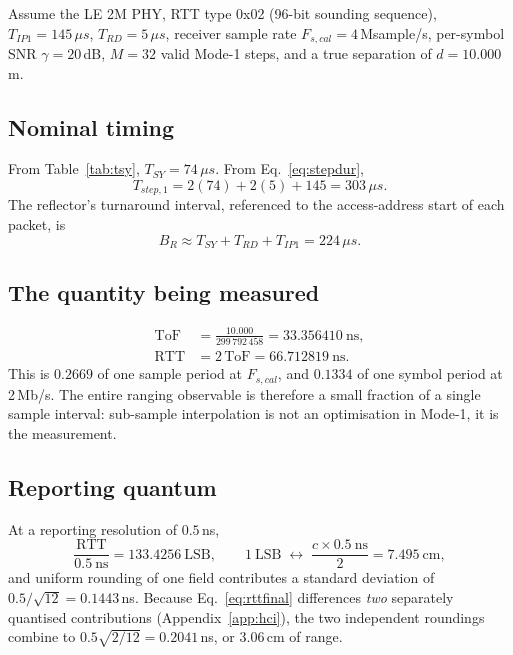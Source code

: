 \documentclass[11pt,a4paper]{article}
\newcommand{\us}{\,\ensuremath{\upmu}s}
\newcommand{\ToF}{\mathrm{ToF}}
\newcommand{\RTT}{\mathrm{RTT}}
\newcommand{\Tsy}{T_{SY}}
\newcommand{\Trd}{T_{RD}}
\newcommand{\Tip}{T_{IP1}}
\providecommand{\upmu}{\mu}
\begin{document}
Assume the LE 2M PHY, RTT type 0x02 (96-bit sounding sequence), $\Tip = 145\us$, $\Trd = 5\us$,
receiver sample rate $F_{s,cal} = 4$\,Msample/s, per-symbol SNR $\gamma = 20$\,dB, $M = 32$ valid
Mode-1 steps, and a true separation of $d = 10.000$\,m.

\subsection{Nominal timing}

From Table~\ref{tab:tsy}, $\Tsy = 74\us$. From Eq.~\eqref{eq:stepdur},
\begin{equation}
T_{step,1} = 2(74) + 2(5) + 145 = 303\us .
\end{equation}
The reflector's turnaround interval, referenced to the access-address start of each packet, is
\begin{equation}
B_R \approx \Tsy + \Trd + \Tip = 224\us .
\end{equation}

\subsection{The quantity being measured}

\begin{align}
\ToF &= \frac{10.000}{299\,792\,458} = 33.356410\ \text{ns}, \\
\RTT &= 2\,\ToF = 66.712819\ \text{ns} .
\end{align}
This is $0.2669$ of one sample period at $F_{s,cal}$, and $0.1334$ of one symbol period at 2\,Mb/s.
The entire ranging observable is therefore a small fraction of a single sample interval: sub-sample
interpolation is not an optimisation in Mode-1, it is the measurement.

\subsection{Reporting quantum}

At a reporting resolution of $0.5$\,ns,
\begin{equation}
\frac{\RTT}{0.5\ \text{ns}} = 133.4256\ \text{LSB},
\qquad
1\ \text{LSB} \;\leftrightarrow\; \frac{c \times 0.5\ \text{ns}}{2} = 7.495\ \text{cm},
\end{equation}
and uniform rounding of one field contributes a standard deviation of
$0.5/\sqrt{12} = 0.1443$\,ns. Because Eq.~\eqref{eq:rttfinal} differences \emph{two} separately
quantised contributions (Appendix~\ref{app:hci}), the two independent roundings combine to
$0.5\sqrt{2/12} = 0.2041$\,ns, or $3.06$\,cm of range.
\end{document}
